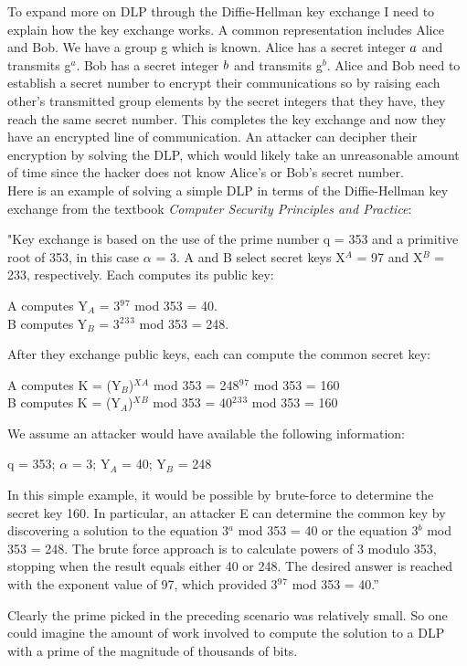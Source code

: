 \documentclass{article}
\begin{document}
\begin{itemize}
    To expand more on DLP through the Diffie-Hellman key exchange I need to explain how the key exchange works. A common representation includes Alice and Bob. We have a group g which is known. Alice has a secret integer $\mathnormal{a}$ and transmits g$^a$. Bob has a secret integer $\mathnormal{b}$ and transmits g$^b$. Alice and Bob need to establish a secret number to encrypt their communications so by raising each other’s transmitted group elements by the secret integers that they have, they reach the same secret number. This completes the key exchange and now they have an encrypted line of communication. An attacker can decipher their encryption by solving the DLP, which would likely take an unreasonable amount of time since the hacker does not know Alice’s or Bob’s secret number. \\
    
    Here is an example of solving a simple DLP in terms of the Diffie-Hellman key exchange from the textbook \textit{Computer Security Principles and Practice}:
    \begin{displayquote}
            "Key exchange is based on the use of the prime number q = 353 and a primitive root of 353, in this case $\alpha$ = 3. A and B select secret keys X$^A$ = 97 and X$^B$ = 233, respectively. Each computes its public key:
            \begin{displayquote}
                    A computes Y$_A$ = 3${^9}{^7}$ mod 353 = 40.\\
	                B computes Y$_B$ = 3${^2}{^3}{^3}$ mod 353 = 248.
            \end{displayquote}
            After they exchange public keys, each can compute the common secret key:
            \begin{displayquote}
                    A computes K = (Y$_B$)${^X}{^A}$ mod 353 = 248${^9}{^7}$ mod 353 = 160 \\
	                B computes K = (Y$_A$)${^X}{^B}$ mod 353 = 40${^2}{^3}{^3}$ mod 353 = 160
            \end{displayquote}
            We assume an attacker would have available the following information:
            \begin{displayquote}
                    q = 353; $\alpha$ = 3; Y$_A$ = 40; Y$_B$ = 248
            \end{displayquote}
            In this simple example, it would be possible by brute-force to determine the secret key 160. In particular, an attacker E can determine the common key by discovering a solution to the equation 3$^a$ mod 353 = 40 or the equation 3$^b$ mod 353 = 248. The brute force approach is to calculate powers of 3 modulo 353, stopping when the result equals either 40 or 248. The desired answer is reached with the exponent value of 97, which provided 3${^9}{^7}$ mod 353 = 40.”
    \end{displayquote}
    Clearly the prime picked in the preceding scenario was relatively small. So one could imagine the amount of work involved to compute the solution to a DLP with a prime of the magnitude of thousands of bits. \\
    

\end{itemize}
\end{document}
